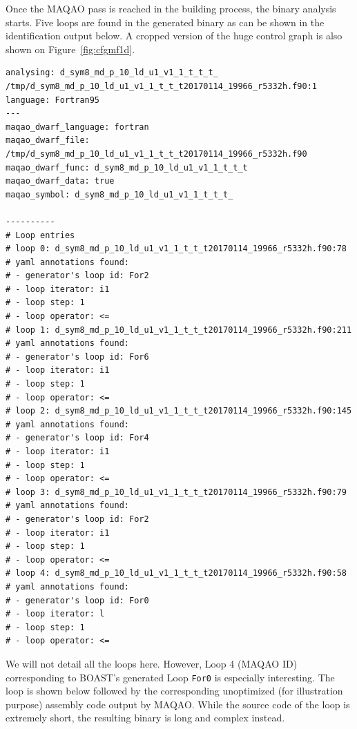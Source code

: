 \documentclass[11pt, a4paper, twoside]{montblanc2}
\begin{document}
Once the MAQAO pass is reached in the building process, the binary analysis 
starts. Five loops are found in the generated binary as can be shown in the 
identification output below. A cropped version of the huge control graph is also 
shown on Figure~\ref{fig:cfgmf1d}.

\begin{verbatim}
analysing: d_sym8_md_p_10_ld_u1_v1_1_t_t_t_
/tmp/d_sym8_md_p_10_ld_u1_v1_1_t_t_t20170114_19966_r5332h.f90:1
language: Fortran95
---
maqao_dwarf_language: fortran
maqao_dwarf_file: /tmp/d_sym8_md_p_10_ld_u1_v1_1_t_t_t20170114_19966_r5332h.f90
maqao_dwarf_func: d_sym8_md_p_10_ld_u1_v1_1_t_t_t
maqao_dwarf_data: true
maqao_symbol: d_sym8_md_p_10_ld_u1_v1_1_t_t_t_

----------
# Loop entries
# loop 0: d_sym8_md_p_10_ld_u1_v1_1_t_t_t20170114_19966_r5332h.f90:78
# yaml annotations found:
# - generator's loop id: For2
# - loop iterator: i1
# - loop step: 1
# - loop operator: <=
# loop 1: d_sym8_md_p_10_ld_u1_v1_1_t_t_t20170114_19966_r5332h.f90:211
# yaml annotations found:
# - generator's loop id: For6
# - loop iterator: i1
# - loop step: 1
# - loop operator: <=
# loop 2: d_sym8_md_p_10_ld_u1_v1_1_t_t_t20170114_19966_r5332h.f90:145
# yaml annotations found:
# - generator's loop id: For4
# - loop iterator: i1
# - loop step: 1
# - loop operator: <=
# loop 3: d_sym8_md_p_10_ld_u1_v1_1_t_t_t20170114_19966_r5332h.f90:79
# yaml annotations found:
# - generator's loop id: For2
# - loop iterator: i1
# - loop step: 1
# - loop operator: <=
# loop 4: d_sym8_md_p_10_ld_u1_v1_1_t_t_t20170114_19966_r5332h.f90:58
# yaml annotations found:
# - generator's loop id: For0
# - loop iterator: l
# - loop step: 1
# - loop operator: <=
\end{verbatim}

We will not detail all the loops here. However, Loop 4 (MAQAO ID) corresponding 
to BOAST's generated Loop \verb|For0| is especially interesting. The loop is 
shown below followed by the corresponding unoptimized (for illustration purpose) 
assembly code output by MAQAO. While the source code of the loop is extremely 
short, the resulting binary is long and complex instead.


\end{document}
